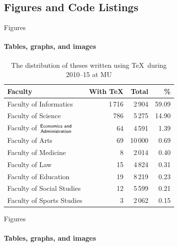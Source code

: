 \documentclass{beamer}
\begin{document}
\begin{darkframes}
      \subsection{Figures and Code Listings}
      \begin{frame}[label=figs1]{Figures}
         \framesubtitle{Tables, graphs, and images}
         \begin{table}[!b]
            {\carlitoTLF %
            \begin{tabularx}{\textwidth}{Xrrr}
               \textbf{Faculty} & \textbf{With \TeX} & \textbf{Total} &
               \textbf{\%} \\
               \toprule
               Faculty of Informatics          & 1\,716   & 2\,904   &
               59.09 \\%
               Faculty of Science                & 786       & 5\,275   &
               14.90 \\%
               Faculty of $\genfrac{}{}{0pt}{}{\textsf{Economics and}}{%
               \textsf{Administration}}$      & 64         & 4\,591   &
               1.39   \\%
               Faculty of Arts                     & 69         & 10\,000 &
               0.69   \\%
               Faculty of Medicine               & 8          & 2\,014   &
               0.40   \\%
               Faculty of Law                      & 15         & 4\,824   &
               0.31   \\%
               Faculty of Education             & 19         & 8\,219   &
               0.23   \\%
               Faculty of Social Studies      & 12         & 5\,599   &
               0.21   \\%
               Faculty of Sports Studies      & 3          & 2\,062   &
               0.15   \\%
               \bottomrule
            \end{tabularx}}
            \caption{The distribution of theses written using \TeX\ during 2010--15 at MU}
         \end{table}
      \end{frame}

      \begin{frame}[label=figs2]{Figures}
         \framesubtitle{Tables, graphs, and images}
         

\end{frame}
\end{darkframes}
\end{document}
